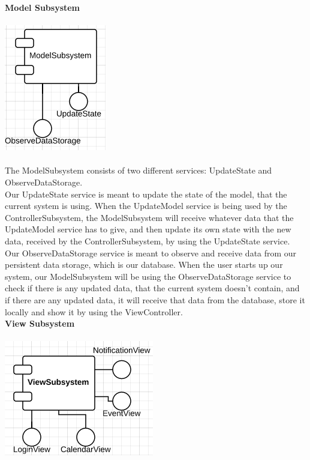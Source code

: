 \textbf{Model Subsystem}\\\\
\includegraphics[scale=0.8]{ModelServices}\\\\

The ModelSubsystem consists of two different services: UpdateState and ObserveDataStorage.\\

Our UpdateState service is meant to update the state of the model, that the current system is using. When the UpdateModel service is being used by the ControllerSubsystem, the ModelSubsystem will receive whatever data that the UpdateModel service has to give, and then update its own state with the new data, received by the ControllerSubsystem, by using the UpdateState service.\\

Our ObserveDataStorage service is meant to observe and receive data from our persistent data storage, which is our database. When the user starts up our system, our ModelSubsystem will be using the ObserveDataStorage service to check if there is any updated data, that the current system doesn't contain, and if there are any updated data, it will receive that data from the database, store it locally and show it by using the ViewController.\\


\textbf{View Subsystem}\\\\
\includegraphics[scale=0.8]{ViewServices}\\\\

